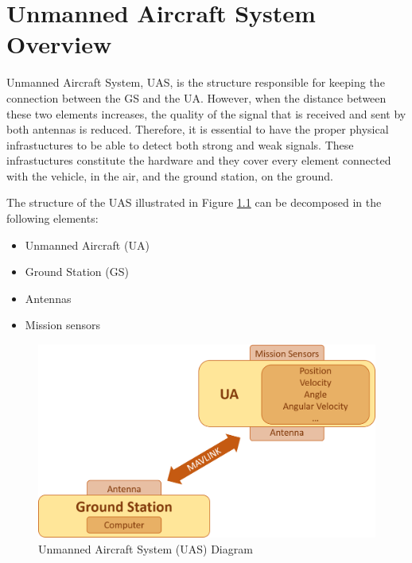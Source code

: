 \chapter{Unmanned Aircraft System Overview}\label{ch:uas}

Unmanned Aircraft System, UAS, is the structure responsible for keeping the connection between the GS and the UA. However, when the distance between these two elements increases, the quality of the signal that is received and sent by both antennas is reduced. Therefore, it is essential to have the proper physical infrastuctures to be able to detect both strong and weak signals. These infrastuctures constitute the hardware and they cover every element connected with the vehicle, in the air, and the ground station, on the ground.


The structure of the UAS illustrated in Figure \ref{fig:uas} can be decomposed in the following elements:
\begin{itemize}
	\item Unmanned Aircraft (UA)
	\item Ground Station (GS)
	\item Antennas
	\item Mission sensors
\end{itemize}

\begin{figure}[H]
	\centering
	\includegraphics[scale=0.4]{figures/uas.png}
	\caption{Unmanned Aircraft System (UAS) Diagram}
	\label{fig:uas}
\end{figure}


